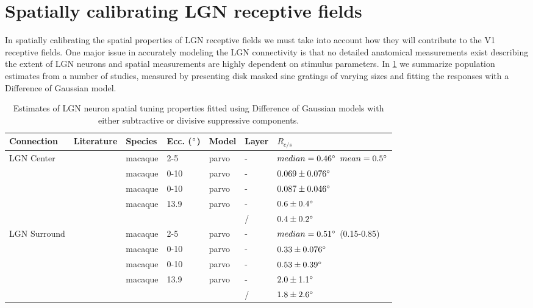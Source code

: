 \section{Spatially calibrating LGN receptive fields}

In spatially calibrating the spatial properties of LGN receptive
fields we must take into account how they will contribute to the V1
receptive fields. One major issue in accurately modeling the LGN
connectivity is that no detailed anatomical measurements exist
describing the extent of LGN neurons and spatial measurements are
highly dependent on stimulus parameters. In \ref{LGNTuning} we
summarize population estimates from a number of studies, measured by
presenting disk masked sine gratings of varying sizes and fitting the
responses with a Difference of Gaussian model.

\begin{table}
  \centering
  \begin{adjustbox}{width=1\textwidth}
  \begin{tabular}{l | l l l l l l}
    Connection   & Literature            & Species  & Ecc. ($\degree$) & Model & Layer & $R_{c/s}$ \\
    \hline
    LGN Center   & \cite{Sceniak2006}    & macaque  & 2-5  & parvo & - & $median = 0.46 \degree$ $mean = 0.5 \degree$ \\
                 & \cite{Levitt2001}     & macaque  & 0-10 & parvo & - & $0.069 \pm 0.076 \degree$ \\
                 & \cite{Spear1994}      & macaque  & 0-10 & parvo & - & $0.087 \pm 0.046 \degree$ \\
                 & \cite{Bonin2005}      & macaque  & 13.9 & parvo & - & $0.6 \pm 0.4 \degree$\\
                 &                       &          &      &       & / & $0.4 \pm 0.2 \degree$ \\
    \hline
    LGN Surround & \cite{Sceniak2006}    & macaque  & 2-5  & parvo & - &$median = 0.51 \degree$ (0.15-0.85) \\
                 & \cite{Levitt2001}     & macaque  & 0-10 & parvo & - & $0.33 \pm 0.076 \degree$ \\
                 & \cite{Spear1994}      & macaque  & 0-10 & parvo & - & $0.53 \pm 0.39 \degree$ \\
                 & \cite{Bonin2005}      & macaque  & 13.9 & parvo & - & $2.0 \pm 1.1 \degree$\\
                 &                       &          &      &       & / & $1.8 \pm 2.6 \degree$\\

    \hline
  \end{tabular}
  \end{adjustbox}
  \caption{Estimates of LGN neuron spatial tuning properties fitted using Difference of Gaussian models
           with either subtractive or divisive suppressive components.}
  \label{LGNTuning}
\end{table}

